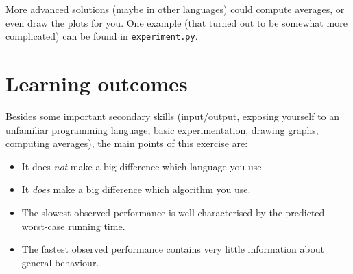 \documentclass{tufte-handout}
\begin{document}
\begin{description}
    More advanced solutions (maybe in other languages) could compute averages, or even draw the plots for you.
    One example (that turned out to be somewhat more complicated) can be found in \href{https://bitbucket.org/rikj/bads-labs/src/master/foursum/src/simpleExp.sh}{\texttt{experiment.py}}.
\end{description}

\section{Learning outcomes}

Besides some important secondary skills (input/output, exposing yourself to an unfamiliar programming language, basic experimentation, drawing graphs, computing averages), the main points of this exercise are:
\begin{itemize}
  \item It does \emph{not} make a big difference which language you use.
  \item It \emph{does} make a big difference which algorithm you use.
  \item The slowest observed performance is well characterised by the predicted worst-case running time.
  \item The fastest observed performance contains very little information about general behaviour.
\end{itemize}
\end{document}
